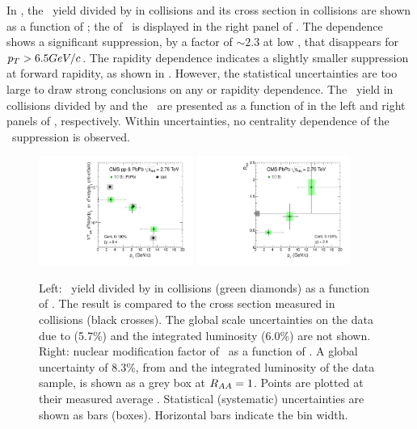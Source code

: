 In , the \PgUa\ yield divided by \taa in \PbPb
collisions and its cross section in \pp collisions are shown as a
function of \pt; the \raa of \PgUa\ is displayed in the right panel of
. The \pt dependence shows a significant
suppression, by a factor of $\sim\!2.3$ at low \pt, that disappears
for $p_T > 6.5GeV/c$. The rapidity dependence indicates a slightly
smaller suppression at forward rapidity, as shown in
. However, the statistical uncertainties are too
large to draw strong conclusions on any \pt or rapidity
dependence. The \PgUa\ yield in \PbPb collisions divided by \taa and
the \PgUa\ \raa are presented as a function of \npart in the left and
right panels of , respectively. Within
uncertainties, no centrality dependence of the \PgUa\ suppression is
observed.

\begin{figure}[htbp]
  \begin{center}
    \includegraphics[width=0.45\textwidth]{chap_YInPbPbColl2010_figures/upsilon_pt}\hspace{1em}
    \includegraphics[width=0.45\textwidth]{chap_YInPbPbColl2010_figures/upsilon_RAA_pt}
    \caption{Left: \PgUa\ yield divided by \taa in \PbPb collisions
      (green diamonds) as a function of \pt. The result is compared to
      the cross section measured in \pp collisions (black crosses).
      The global scale uncertainties on the \PbPb data due to \taa
      (5.7\%) and the \pp integrated luminosity (6.0\%) are not
      shown. Right: nuclear modification factor \raa of \PgUa\ as a
      function of \pt. A global uncertainty of 8.3\%, from \taa and
      the integrated luminosity of the \pp data sample, is shown as a
      grey box at $R_{AA}=1$. Points are plotted at their measured
      average \pt. Statistical (systematic) uncertainties are shown as
      bars (boxes). Horizontal bars indicate the bin width.}
    \label{fig:upsilon_pt}
  \end{center}
\end{figure}

